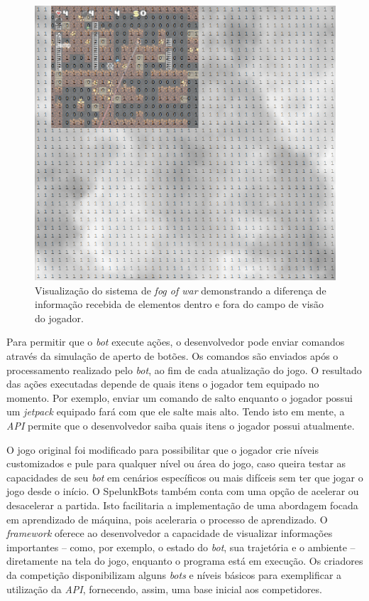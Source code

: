 \begin{figure}[htb!]
\centering
\includegraphics[width=.65\textwidth]{fig/spelunkbots-fow.png}
\caption {\label{fig:spelunkbots-fow}Visualização do sistema de \textit{fog of
war} demonstrando a diferença de informação recebida de elementos dentro e fora
do campo de visão do jogador.}
\end{figure}

Para permitir que o \textit{bot} execute ações, o desenvolvedor pode enviar
comandos através da simulação de aperto de botões. Os comandos são enviados após
o processamento realizado pelo \textit{bot}, ao fim de cada atualização do jogo.
O resultado das ações executadas depende de quais itens o jogador tem equipado
no momento. Por exemplo, enviar um comando de salto enquanto o jogador possui um
\textit{jetpack} equipado fará com que ele salte mais alto. Tendo isto em mente,
a \textit{API} permite que o desenvolvedor saiba quais itens o jogador possui
atualmente.

O jogo original foi modificado para possibilitar que o jogador crie níveis
customizados e pule para qualquer nível ou área do jogo, caso queira testar as
capacidades de seu \textit{bot} em cenários específicos ou mais difíceis sem ter
que jogar o jogo desde o início. O SpelunkBots também conta com uma opção de
acelerar ou desacelerar a partida. Isto facilitaria a implementação de uma
abordagem focada em aprendizado de máquina, pois aceleraria o processo de
aprendizado. O \textit{framework} oferece ao desenvolvedor a capacidade de
visualizar informações importantes -- como, por exemplo, o estado do
\textit{bot}, sua trajetória e o ambiente -- diretamente na tela do jogo,
enquanto o programa está em execução. Os criadores da competição disponibilizam
alguns \textit{bots} e níveis básicos para exemplificar a utilização da
\textit{API}, fornecendo, assim, uma base inicial aos competidores.

